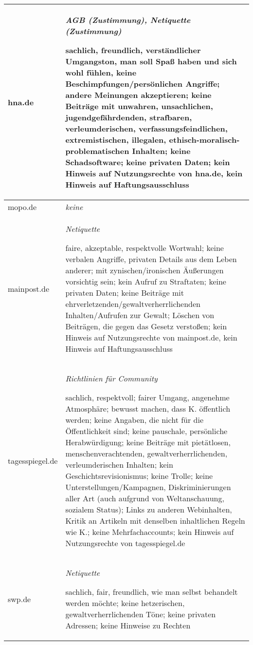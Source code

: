 \begin{landscape}
\begin{longtable}{lp{170mm}}
hna.de & \emph{AGB (Zustimmung), Netiquette (Zustimmung)}

	sachlich, freundlich, verständlicher Umgangston, man soll Spaß haben und
	sich wohl fühlen, keine Beschimpfungen/persönlichen Angriffe; andere
	Meinungen akzeptieren; keine Beiträge mit
	un\-wah\-ren, un\-sach\-li\-chen, ju\-gend\-ge\-fähr\-den\-den, straf\-ba\-ren, ver\-leum\-de\-ri\-schen, ver\-fas\-sungs\-feind\-li\-chen, ex\-tre\-mis\-ti\-schen, il\-le\-ga\-len, ethisch-mo\-ra\-lisch-pro\-ble\-ma\-ti\-schen
	Inhalten; keine Schadsoftware; keine privaten Daten; kein Hinweis auf
	Nutzungsrechte von hna.de, kein Hinweis auf
	Haftungsausschluss\tabularnewline\hline

mopo.de &  \emph{keine}\tabularnewline\hline

mainpost.de& \emph{Netiquette}

	faire, akzeptable, respektvolle Wortwahl; keine verbalen Angriffe,
	privaten Details aus dem Leben anderer; mit zynischen/ironischen
	Äußerungen vorsichtig sein; kein Aufruf zu Straftaten; keine privaten
	Daten; keine Beiträge mit ehrverletzenden/gewaltverherrlichenden
	Inhalten/Aufrufen zur Gewalt; Löschen von Beiträgen, die gegen das
	Gesetz verstoßen; kein Hinweis auf Nutzungsrechte von mainpost.de, kein
	Hinweis auf Haftungsausschluss\tabularnewline\hline

tagesspiegel.de & \emph{Richtlinien für Community}

	sachlich, respektvoll; fairer Umgang, angenehme Atmosphäre; bewusst
	machen, dass K. öffentlich werden; keine Angaben, die nicht für die
	Öffentlichkeit sind; keine pauschale, persönliche Herabwürdigung; keine
	Beiträge mit
	pietätlosen, menschenverachtenden, gewaltverherrlichenden, verleumderischen
	Inhalten; kein Geschichtsrevisionismus; keine Trolle; keine
	Unterstellungen/Kampagnen, Diskriminierungen aller Art (auch aufgrund von
	Weltanschauung, sozialem Status); Links zu anderen Webinhalten, Kritik an
	Artikeln mit denselben inhaltlichen Regeln wie K.; keine
	Mehrfachaccounts; kein Hinweis auf Nutzungsrechte von
	tagesspiegel.de\tabularnewline\hline

swp.de & \emph{Netiquette}

	sachlich, fair, freundlich, wie man selbst behandelt werden möchte;
	keine het\-ze\-ri\-schen, ge\-walt\-ver\-herr\-li\-chen\-den Töne; keine privaten Adressen;
	keine Hinweise zu Rechten\tabularnewline

\end{longtable}
\end{landscape}
